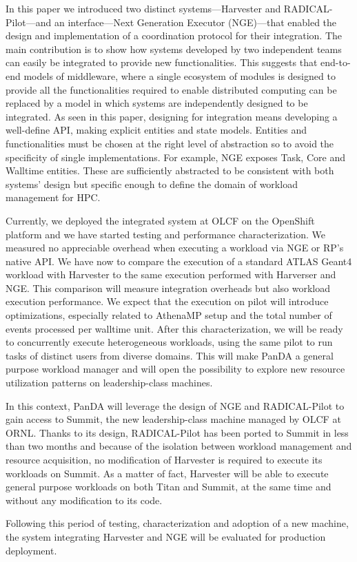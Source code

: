 \documentclass{webofc}
\begin{document}
In this paper we introduced two distinct systems---Harvester and
RADICAL-Pilot---and an interface---Next Generation Executor (NGE)---that
enabled the design and implementation of a coordination protocol for their
integration. The main contribution is to show how systems developed by two
independent teams can easily be integrated to provide new functionalities.
This suggests that end-to-end models of middleware, where a single ecosystem
of modules is designed to provide all the functionalities required to enable
distributed computing can be replaced by a model in which systems are
independently designed to be integrated. As seen in this paper, designing for
integration means developing a well-define API, making explicit entities and
state models. Entities and functionalities must be chosen at the right level
of abstraction so to avoid the specificity of single implementations. For
example, NGE exposes Task, Core and Walltime entities. These are sufficiently
abstracted to be consistent with both systems’ design but specific enough to
define the domain of workload management for HPC.

Currently, we deployed the integrated system at OLCF on the OpenShift
platform and we have started testing and performance characterization. We
measured no appreciable overhead when executing a workload via NGE or RP's
native API. We have now to compare the execution of a standard ATLAS Geant4
workload with Harvester to the same execution performed with Harverser and
NGE. This comparison will measure integration overheads but also workload
execution performance. We expect that the execution on pilot will introduce
optimizations, especially related to AthenaMP setup and the total number of
events processed per walltime unit. After this characterization, we will be
ready to concurrently execute heterogeneous workloads, using the same pilot
to run tasks of distinct users from diverse domains. This will make PanDA a
general purpose workload manager and will open the possibility to explore new
resource utilization patterns on leadership-class machines.

In this context, PanDA will leverage the design of NGE and RADICAL-Pilot to
gain access to Summit, the new leadership-class machine managed by OLCF at
ORNL. Thanks to its design, RADICAL-Pilot has been ported to Summit in less
than two months and because of the isolation between workload management and
resource acquisition, no modification of Harvester is required to execute its
workloads on Summit. As a matter of fact, Harvester will be able to execute
general purpose workloads on both Titan and Summit, at the same time and
without any modification to its code.

Following this period of testing, characterization and adoption of a new
machine, the system integrating Harvester and NGE will be evaluated for
production deployment.



\end{document}
